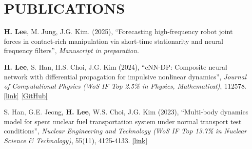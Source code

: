 \documentclass[a4paper,10pt]{extarticle}
\begin{document}
\section*{PUBLICATIONS}
\begin{etaremune}[leftmargin=.5cm, itemsep=0.05cm]
	\item \textbf{H. Lee}, M. Jung, J.G. Kim. (2025), “Forecasting high-frequency robot joint forces in contact-rich manipulation via short-time stationarity and neural frequency filters”, \textsl{Manuscript in preparation.}
	\item \textbf{H. Lee}, S. Han, H.S. Choi, J.G. Kim (2024), “cNN-DP: Composite neural network with differential propagation for impulsive nonlinear dynamics”, \textit{Journal of Computational Physics (WoS IF Top 2.5\% in Physics, Mathematical)}, 112578. \href{https://www.sciencedirect.com/science/article/pii/S0021999123006733?casa_token=ARUkhI8XI8YAAAAA:wTzCIauJvSlonWw-J-SlAFqPX6NZRQS-qBX59l4YN5O3caEppoglU0duVmMkZYf4nWYd7tm_D_E}{\color{blue}[link]} \href{https://github.com/leehyeonbeen/cNN-DP}{\color{blue}[GitHub]}
	\item S. Han, G.E. Jeong, \textbf{H. Lee}, W.S. Choi, J.G. Kim (2023), “Multi-body dynamics model for spent nuclear fuel transportation system under normal transport test conditions”, \textit{Nuclear Engineering and Technology (WoS IF Top 13.7\% in Nuclear Science \& Technology)}, 55(11), 4125-4133. \href{https://www.google.com/url?sa=t&rct=j&q=&esrc=s&source=web&cd=&cad=rja&uact=8&ved=2ahUKEwij36zWpNKCAxXMMEQIHSBfBMUQFnoECBEQAQ&url=https%3A%2F%2Fwww.sciencedirect.com%2Fscience%2Farticle%2Fpii%2FS1738573323003492&usg=AOvVaw1zj_G3k5c77uhMNnmu0EEC&opi=89978449}{\color{blue}[link]}
\end{etaremune}
\end{document}
